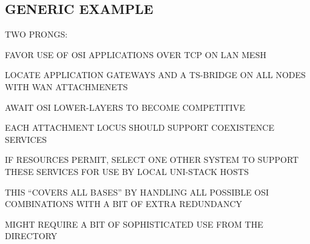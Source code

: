 \begin{bwslide}
\end{bwslide}


\begin{bwslide}
\end{bwslide}


\begin{bwslide}
\part*	{GENERIC EXAMPLE}\bf

\begin{nrtc}
\item	TWO PRONGS:
    \begin{nrtc}
    \item	FAVOR USE OF OSI APPLICATIONS OVER TCP ON LAN MESH

    \item	LOCATE APPLICATION GATEWAYS AND A TS-BRIDGE ON ALL NODES
		WITH WAN ATTACHMENETS
    \end{nrtc}

\item	AWAIT OSI LOWER-LAYERS TO BECOME COMPETITIVE
\end{nrtc}
\end{bwslide}


\begin{bwslide}

\begin{nrtc}
\item	EACH ATTACHMENT LOCUS SHOULD SUPPORT COEXISTENCE SERVICES

\item	IF RESOURCES PERMIT, SELECT ONE OTHER SYSTEM TO SUPPORT THESE
	SERVICES FOR USE BY LOCAL UNI-STACK HOSTS

\item	THIS ``COVERS ALL BASES'' BY HANDLING ALL POSSIBLE OSI COMBINATIONS
	WITH A BIT OF EXTRA REDUNDANCY

\item	MIGHT REQUIRE A BIT OF SOPHISTICATED USE FROM THE DIRECTORY
\end{nrtc}
\end{bwslide}





